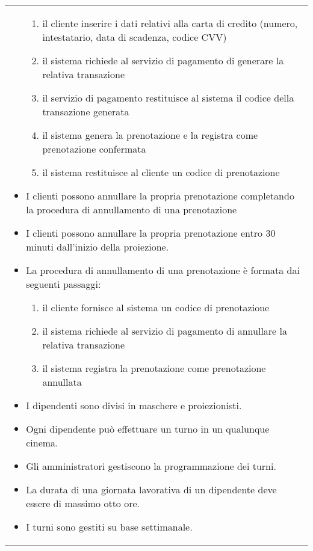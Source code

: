 \begin{longtable}{|p{\linewidth}|}
\begin{itemize}
\begin{enumerate}
                  \item il cliente inserire i dati relativi alla carta
                        di credito (numero, intestatario, data di scadenza,
                        codice CVV)
                  \item il sistema richiede al servizio di pagamento di
                        generare la relativa transazione
                  \item il servizio di pagamento restituisce al sistema
                        il codice della transazione generata
                  \item il sistema genera la prenotazione e la registra
                        come prenotazione confermata
                  \item il sistema restituisce al cliente un codice di
                        prenotazione
              \end{enumerate}
        \item I clienti possono annullare la propria prenotazione completando
              la procedura di annullamento di una prenotazione
        \item I clienti possono annullare la propria prenotazione
              entro 30 minuti dall'inizio della proiezione.
        \item La procedura di annullamento di una prenotazione è formata dai
              seguenti passaggi:
              \begin{enumerate}
                  \item il cliente fornisce al sistema un codice di
                        prenotazione
                  \item il sistema richiede al servizio di pagamento di
                        annullare la relativa transazione
                  \item il sistema registra la prenotazione come prenotazione
                        annullata
              \end{enumerate}
        \item I dipendenti sono divisi in maschere e proiezionisti.
        \item Ogni dipendente può effettuare un turno in un qualunque cinema.
        \item Gli amministratori gestiscono la programmazione dei turni.
        \item La durata di una giornata lavorativa di un dipendente deve essere
              di massimo otto ore.
        \item I turni sono gestiti su base settimanale.

\end{itemize}
\end{longtable}
